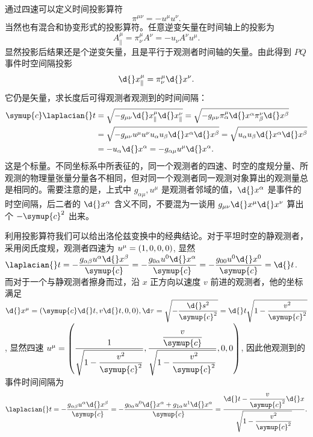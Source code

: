 \documentclass[UTF8, 12pt, a4paper, oneside, onecolumn, fontset=none]{ctexart}
\begin{document}
通过四速可以定义时间投影算符
\begin{equation}
\pi^{\mu\nu}=-u^{\mu}u^{\nu}.
\end{equation}
当然也有混合和协变形式的投影算符。任意逆变矢量在时间轴上的投影为
\begin{equation}
A^{\mu}_{\parallel}=\pi^{\mu}_{\nu}A^{\nu}=-u_{\nu}A^{\nu}u^{\mu}.
\end{equation}
显然投影后结果还是个逆变矢量，且是平行于观测者时间轴的矢量。由此得到 $PQ$ 事件时空间隔投影
\begin{equation}
\d{}x^{\mu}_{\parallel}=\pi^{\mu}_{\nu}\d{}x^{\nu}.
\end{equation}
它仍是矢量，求长度后可得观测者观测到的时间间隔：
\begin{align}
\symup{c}\laplacian{}t&=\sqrt{-g_{\mu\nu}\d{}x^{\mu}_{\parallel}\d{}x^{\nu}_{\parallel}}=\sqrt{-g_{\mu\nu}\pi^{\mu}_{\alpha}\d{}x^{\alpha}\pi^{\nu}_{\beta}\d{}x^{\beta}}\notag\\
&=\sqrt{-g_{\mu\nu}u^{\mu}u^{\nu}u_{\alpha}u_{\beta}\d{}x^{\alpha}\d{}x^{\beta}}=\sqrt{u_{\alpha}u_{\beta}\d{}x^{\alpha}\d{}x^{\beta}}\notag\\
&=-u_{\alpha}\d{}x^{\alpha}=-g_{\alpha\mu}u^{\mu}\d{}x^{\alpha}.
\end{align}
这是个标量。不同坐标系中所表征的，同一个观测者的四速、时空的度规分量、所观测的物理量张量分量各不相同，但对同一个观测者同一观测对象算出的观测量总是相同的。需要注意的是，上式中 $g_{\alpha\mu}, u^{\mu}$ 是观测者邻域的值，$\d{}x^{\alpha}$ 是事件的时空间隔，后二者的 $\d{}x^{\alpha}$ 含义不同，不要混为一谈用 $g_{\mu\nu}\d{}x^{\mu}\d{}x^{\nu}$ 算出个 $-\symup{c}^{2}$ 出来。

利用投影算符我们可以给出洛伦兹变换中的经典结论。对于平坦时空的静观测者，采用闵氏度规，观测者四速为 $u^{\mu}=\mleft(1, 0, 0, 0\mright)$, 显然 $\laplacian{}t=-\dfrac{g_{\alpha\beta}u^{\alpha}\d{}x^{\beta}}{\symup{c}}=-\dfrac{g_{0\alpha}u^{0}\d{}x^{\alpha}}{\symup{c}}=-\dfrac{g_{00}u^{0}\d{}x^{0}}{\symup{c}}=\d{}t$. 而对于一个与静观测者擦身而过，沿 $x$ 正方向以速度 $v$ 前进的观测者，他的坐标满足 $\d{}x^{\mu}=\mleft(\symup{c}\d{}t, v\d{}t, 0, 0\mright),\d\tau=\sqrt{-\dfrac{\d{}s^{2}}{\symup{c}^{2}}}=\d{}t\sqrt{1-\dfrac{v^{2}}{\symup{c}^{2}}}$, 显然四速 $u^{\mu}=\mleft(\dfrac{1}{\sqrt{1-\dfrac{v^{2}}{\symup{c}^{2}}}},\dfrac{\dfrac{v}{\symup{c}}}{\sqrt{1-\dfrac{v^{2}}{\symup{c}^{2}}}}, 0, 0\mright)$, 因此他观测到的事件时间间隔为
\begin{equation}
\laplacian{}t=-\frac{g_{\alpha\beta}u^{\alpha}\d{}x^{\beta}}{\symup{c}}=-\frac{g_{0\alpha}u^{0}\d{}x^{\alpha}+g_{1\alpha}u^{1}\d{}x^{\alpha}}{\symup{c}}=\frac{\d{}t-\dfrac{v}{\symup{c}^{2}}\d{}x}{\sqrt{1-\dfrac{v^{2}}{\symup{c}^{2}}}}.
\end{equation}
\end{document}
